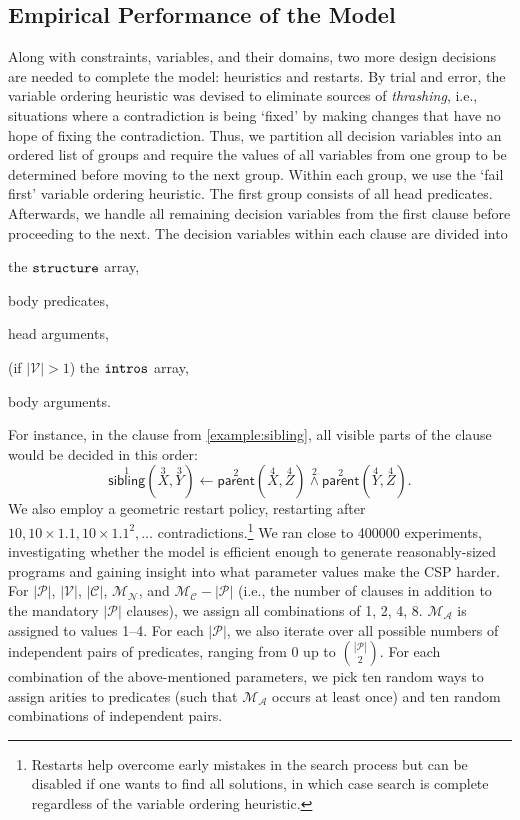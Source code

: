 \documentclass[runningheads]{llncs}
\newcommand{\variable}[1]{\texttt{\textup{#1}}}
\newcommand{\predicates}{\mathcal{P}}
\newcommand{\variables}{\mathcal{V}}
\newcommand{\constants}{\mathcal{C}}
\newcommand{\maxArity}{\mathcal{M}_{\mathcal{A}}}
\newcommand{\maxNumNodes}{\mathcal{M}_{\mathcal{N}}}
\newcommand{\maxNumClauses}{\mathcal{M}_{\mathcal{C}}}
\begin{document}
\subsection{Empirical Performance of the Model} \label{sec:experiment1}

Along with constraints, variables, and their domains, two more design decisions
are needed to complete the model: heuristics and restarts. By trial and error,
the variable ordering heuristic was devised to eliminate sources of
\emph{thrashing}, i.e., situations where a contradiction is being `fixed' by
making changes that have no hope of fixing the contradiction. Thus, we partition
all decision variables into an ordered list of groups and require the values of
all variables from one group to be determined before moving to the next group.
Within each group, we use the `fail first' variable ordering heuristic. The
first group consists of all head predicates. Afterwards, we handle all remaining
decision variables from the first clause before proceeding to the next. The
decision variables within each clause are divided into
\begin{enumerate*}[(a)]
\item the $\variable{structure}$ array,
\item body predicates,
\item head arguments,
\item (if $|\variables{}| > 1$) the $\variable{intros}$ array,
\item body arguments.
\end{enumerate*}
For instance, in the clause from \cref{example:sibling}, all visible parts of
the clause would be decided in this order:
\[
  \overset{1}{\mathsf{sibling}}(\overset{3}{X}, \overset{3}{Y}) \gets
  \overset{2}{\mathsf{parent}}(\overset{4}{X}, \overset{4}{Z})
  \overset{2}{\land} \overset{2}{\mathsf{parent}}(\overset{4}{Y},
  \overset{4}{Z}).
\]
We also employ a geometric restart policy, restarting after $10, 10 \times 1.1,
10 \times 1.1^2, \dots$ contradictions.\footnote{Restarts help overcome early
  mistakes in the search process but can be disabled if one wants to find all
  solutions, in which case search is complete regardless of the variable
  ordering heuristic.} We ran close to \num{400000} experiments, investigating
whether the model is efficient enough to generate reasonably-sized programs and
gaining insight into what parameter values make the CSP harder. For
$|\predicates{}|$, $|\variables{}|$, $|\constants{}|$, $\maxNumNodes{}$, and
$\maxNumClauses{} - |\predicates{}|$ (i.e., the number of clauses in addition to
the mandatory $|\predicates{}|$ clauses), we assign all combinations of 1, 2, 4,
8. $\maxArity{}$ is assigned to values 1--4. For each $|\predicates{}|$, we also
iterate over all possible numbers of independent pairs of predicates, ranging
from 0 up to $\binom{|\predicates{}|}{2}$. For each combination of the
above-mentioned parameters, we pick ten random ways to assign arities to
predicates (such that $\maxArity{}$ occurs at least once) and ten random
combinations of independent pairs.
\end{document}
